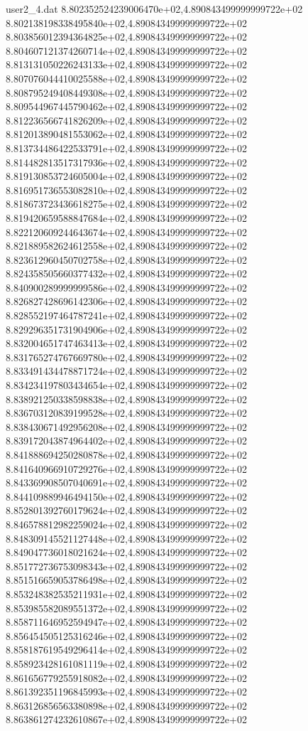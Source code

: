 \begin{filecontents}{user2_4.dat}
8.802352524239006470e+02,4.890843499999999722e+02
8.802138198338495840e+02,4.890843499999999722e+02
8.803856012394364825e+02,4.890843499999999722e+02
8.804607121374260714e+02,4.890843499999999722e+02
8.813131050226243133e+02,4.890843499999999722e+02
8.807076044410025588e+02,4.890843499999999722e+02
8.808795249408449308e+02,4.890843499999999722e+02
8.809544967445790462e+02,4.890843499999999722e+02
8.812236566741826209e+02,4.890843499999999722e+02
8.812013890481553062e+02,4.890843499999999722e+02
8.813734486422533791e+02,4.890843499999999722e+02
8.814482813517317936e+02,4.890843499999999722e+02
8.819130853724605004e+02,4.890843499999999722e+02
8.816951736553082810e+02,4.890843499999999722e+02
8.818673723436618275e+02,4.890843499999999722e+02
8.819420659588847684e+02,4.890843499999999722e+02
8.822120609244643674e+02,4.890843499999999722e+02
8.821889582624612558e+02,4.890843499999999722e+02
8.823612960450702758e+02,4.890843499999999722e+02
8.824358505660377432e+02,4.890843499999999722e+02
8.840900289999999586e+02,4.890843499999999722e+02
8.826827428696142306e+02,4.890843499999999722e+02
8.828552197464787241e+02,4.890843499999999722e+02
8.829296351731904906e+02,4.890843499999999722e+02
8.832004651747463413e+02,4.890843499999999722e+02
8.831765274767669780e+02,4.890843499999999722e+02
8.833491434478871724e+02,4.890843499999999722e+02
8.834234197803434654e+02,4.890843499999999722e+02
8.838921250338598838e+02,4.890843499999999722e+02
8.836703120839199528e+02,4.890843499999999722e+02
8.838430671492956208e+02,4.890843499999999722e+02
8.839172043874964402e+02,4.890843499999999722e+02
8.841888694250280878e+02,4.890843499999999722e+02
8.841640966910729276e+02,4.890843499999999722e+02
8.843369908507040691e+02,4.890843499999999722e+02
8.844109889946494150e+02,4.890843499999999722e+02
8.852801392760179624e+02,4.890843499999999722e+02
8.846578812982259024e+02,4.890843499999999722e+02
8.848309145521127448e+02,4.890843499999999722e+02
8.849047736018021624e+02,4.890843499999999722e+02
8.851772736753098343e+02,4.890843499999999722e+02
8.851516659053786498e+02,4.890843499999999722e+02
8.853248382535211931e+02,4.890843499999999722e+02
8.853985582089551372e+02,4.890843499999999722e+02
8.858711646952594947e+02,4.890843499999999722e+02
8.856454505125316246e+02,4.890843499999999722e+02
8.858187619549296414e+02,4.890843499999999722e+02
8.858923428161081119e+02,4.890843499999999722e+02
8.861656779255918082e+02,4.890843499999999722e+02
8.861392351196845993e+02,4.890843499999999722e+02
8.863126856563380898e+02,4.890843499999999722e+02
8.863861274232610867e+02,4.890843499999999722e+02

\end{filecontents}
